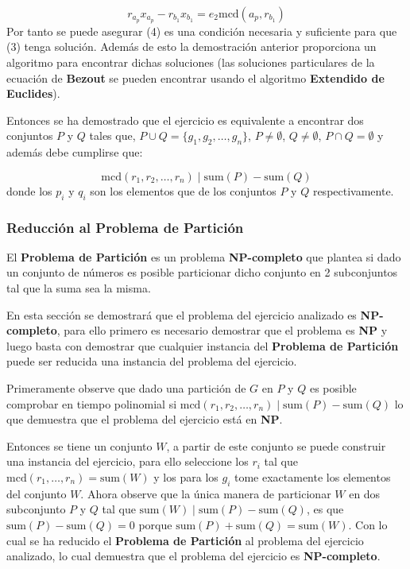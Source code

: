 \documentclass{article}
\begin{document}
\begin{equation}
    r_{a_p}x_{a_p}-r_{b_1}x_{b_1} =e_{2}\text{mcd}(a_p, r_{b_1})
\end{equation}
Por tanto se puede asegurar (4) es una condición necesaria y suficiente para que (3) tenga solución. Además de esto la demostración
anterior proporciona un algoritmo para encontrar dichas soluciones (las soluciones particulares de la ecuación de \textbf{Bezout} se pueden encontrar
usando el algoritmo \textbf{Extendido de Euclides}).

Entonces se ha demostrado que el ejercicio es equivalente a encontrar dos conjuntos $P$ y $Q$ tales que, $P \cup Q =\{g_1,g_2, \ldots, g_n\}$,
$P \neq \emptyset $, $Q \neq \emptyset$, $P \cap Q=\emptyset$ y además debe cumplirse que:

\begin{equation}
    \text{mcd}(r_1,r_2,\ldots ,r_n) \mid \text{sum}(P) - \text{sum}(Q)
\end{equation}
donde los $p_i$ y $q_i$ son los elementos que de los conjuntos $P$ y $Q$ respectivamente.

\subsubsection{Reducción al Problema de Partición}

El \textbf{Problema de Partición} es un problema \textbf{NP-completo} que plantea si dado un conjunto de números es posible
particionar dicho conjunto en 2 subconjuntos tal que la suma sea la misma.

En esta sección se demostrará que el problema del ejercicio analizado es \textbf{NP-completo}, para ello primero es necesario demostrar
que el problema es \textbf{NP} y luego basta con demostrar que cualquier instancia del \textbf{Problema de Partición} puede ser reducida
una instancia del problema del ejercicio.

Primeramente observe que dado una partición de $G$ en $P$ y $Q$ es posible comprobar en tiempo polinomial si $\text{mcd}(r_1,r_2,\ldots ,r_n) \mid \text{sum}(P) - \text{sum}(Q)$
lo que demuestra que el problema del ejercicio está en \textbf{NP}.

Entonces se tiene un conjunto $W$, a partir de este conjunto se puede construir una instancia del ejercicio, para ello seleccione
los $r_i$ tal que $\text{mcd}(r_1,\ldots,r_n)=\text{sum}(W)$ y los para los $g_i$ tome exactamente los elementos del conjunto $W$. Ahora observe
que la única manera de particionar $W$ en dos subconjunto $P$ y $Q$ tal que $\text{sum}(W) \mid \text{sum}(P) - \text{sum}(Q)$, es que
$\text{sum}(P) - \text{sum}(Q)=0$ porque $\text{sum}(P) + \text{sum}(Q)=\text{sum}(W)$. Con lo cual se ha reducido el \textbf{Problema de Partición}
al problema del ejercicio analizado, lo cual demuestra que el problema del ejercicio es \textbf{NP-completo}.
\end{document}
